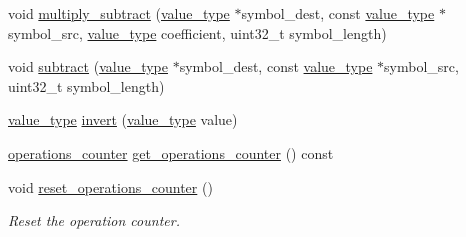 \begin{DoxyCompactItemize}
void \hyperlink{classkodo_1_1finite__field__counter_a8e27adca9225134a90e23691741d211d}{multiply\-\_\-subtract} (\hyperlink{classkodo_1_1finite__field__counter_a155bca81853a6feeed7e98a3207bbfe6}{value\-\_\-type} $\ast$symbol\-\_\-dest, const \hyperlink{classkodo_1_1finite__field__counter_a155bca81853a6feeed7e98a3207bbfe6}{value\-\_\-type} $\ast$symbol\-\_\-src, \hyperlink{classkodo_1_1finite__field__counter_a155bca81853a6feeed7e98a3207bbfe6}{value\-\_\-type} coefficient, uint32\-\_\-t symbol\-\_\-length)
\begin{DoxyCompactList}\small\item\em \end{DoxyCompactList}\item 
void \hyperlink{classkodo_1_1finite__field__counter_aa06f9cc0f5083187602d1862ae6cb5fb}{subtract} (\hyperlink{classkodo_1_1finite__field__counter_a155bca81853a6feeed7e98a3207bbfe6}{value\-\_\-type} $\ast$symbol\-\_\-dest, const \hyperlink{classkodo_1_1finite__field__counter_a155bca81853a6feeed7e98a3207bbfe6}{value\-\_\-type} $\ast$symbol\-\_\-src, uint32\-\_\-t symbol\-\_\-length)
\begin{DoxyCompactList}\small\item\em \end{DoxyCompactList}\item 
\hyperlink{classkodo_1_1finite__field__counter_a155bca81853a6feeed7e98a3207bbfe6}{value\-\_\-type} \hyperlink{classkodo_1_1finite__field__counter_a9f1fd66c2e9bb5b2cc24a6b3d1faa139}{invert} (\hyperlink{classkodo_1_1finite__field__counter_a155bca81853a6feeed7e98a3207bbfe6}{value\-\_\-type} value)
\begin{DoxyCompactList}\small\item\em \end{DoxyCompactList}\item 
\hyperlink{structkodo_1_1operations__counter}{operations\-\_\-counter} \hyperlink{classkodo_1_1finite__field__counter_ac6272ce990b6bcd7ac6b78c39470045c}{get\-\_\-operations\-\_\-counter} () const 
\item 
\hypertarget{classkodo_1_1finite__field__counter_a5de4892c01c0780541b52449f8e0f1fc}{void \hyperlink{classkodo_1_1finite__field__counter_a5de4892c01c0780541b52449f8e0f1fc}{reset\-\_\-operations\-\_\-counter} ()}\label{classkodo_1_1finite__field__counter_a5de4892c01c0780541b52449f8e0f1fc}

\begin{DoxyCompactList}\small\item\em Reset the operation counter. \end{DoxyCompactList}\end{DoxyCompactItemize}


